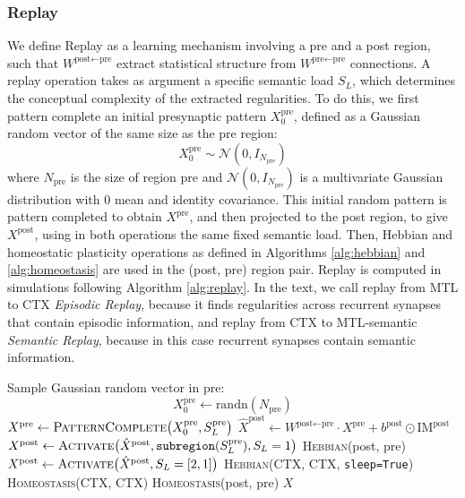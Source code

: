 \documentclass{article}
\begin{document}
\subsubsection*{Replay}
We define \textrm{Replay} as a learning mechanism involving a pre and a post region, such that $W^{\textrm{post}\leftarrow\textrm{pre}}$ extract statistical structure from $W^{\textrm{pre}\leftarrow\textrm{pre}}$ connections. A replay operation takes as argument a specific semantic load $S_L$, which determines the conceptual complexity of the extracted regularities. To do this, we first pattern complete an initial presynaptic pattern $X^\textrm{pre}_0$, defined as a Gaussian random vector of the same size as the pre region:
\begin{equation}
     X^\textrm{pre}_{0} \sim \mathcal{N}(0, I_{N_\textrm{pre}})
\end{equation}
where $N_\textrm{pre}$ is the size of region pre and $\mathcal{N}(0, I_{N_\textrm{pre}})$ is a multivariate Gaussian distribution with 0 mean and identity covariance. This initial random pattern is pattern completed to obtain $X^\textrm{pre}$, and then projected to the post region, to give $X^\textrm{post}$, using in both operations the same fixed semantic load. Then, Hebbian and homeostatic plasticity operations as defined in Algorithms \ref{alg:hebbian} and \ref{alg:homeostasis} are used in the (post, pre) region pair. Replay is computed in simulations following Algorithm \ref{alg:replay}. In the text, we call replay from MTL to CTX \textit{Episodic Replay}, because it finds regularities across recurrent synapses that contain episodic information, and replay from CTX to MTL-semantic \textit{Semantic Replay}, because in this case recurrent synapses contain semantic information.
\begin{algorithm}[h!]
\caption{Replay}\label{alg:replay}
\begin{algorithmic}[1]
    \State Sample Gaussian random vector in pre:
        \[
            X_0^\textrm{pre} \gets \text{randn}(N_\textrm{pre})
        \]
    \State $X^\textrm{pre} \gets \textsc{PatternComplete}\bigl(X^\textrm{pre}_0, S^\textrm{pre}_L\bigr)$
    \State $\hat{X}^\textrm{post} \gets W^{\textrm{post}\leftarrow\textrm{pre}}\cdot X^\textrm{pre} + b^\textrm{post}\odot\textrm{IM}^\textrm{post}$
\State $X^\textrm{post} \gets \textsc{Activate}\bigl(\hat{X}^\textrm{post},  \texttt{subregion}(S_L^\textrm{pre}), S_L=1 \bigr)$
    \State \textsc{Hebbian}(post, pre)
\State $X^\textrm{post} \gets \textsc{Activate}\bigl(\hat{X}^\textrm{post}, S_L=[2, 1] \bigr)$ 
\EndIf
        \State \textsc{Hebbian}(CTX, CTX, \texttt{sleep=True})
        \State \textsc{Homeostasis}(CTX, CTX)
    \EndIf
    \State \textsc{Homeostasis}(post, pre)
    \State \Return $X$
\EndFunction
\end{algorithmic}
\end{algorithm}
\end{document}

